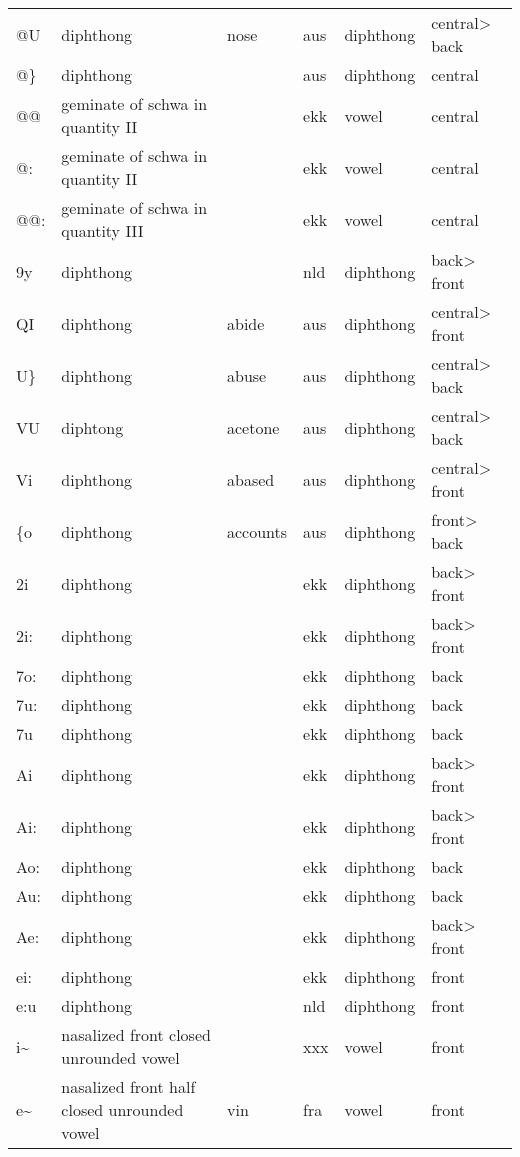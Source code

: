 {\begin{longtable}{l|p{.3\linewidth}|p{.15\linewidth}|l|p{.15\linewidth}|l}
	@U	& diphthong	& nose	& aus	& diphthong	& central\textgreater{} back	\\
	@\}	& diphthong	& 	& aus	& diphthong	& central	\\
	@@	& geminate of schwa in quantity II	& 	& ekk	& vowel	& central	\\
	@:	& geminate of schwa in quantity II	& 	& ekk	& vowel	& central	\\
	@@:	& geminate of schwa in quantity III	& 	& ekk	& vowel	& central	\\
	9y	& diphthong	& 	& nld	& diphthong	& back\textgreater{} front	\\
	QI	& diphthong	& abide	& aus	& diphthong	& central\textgreater{} front	\\
	U\}	& diphthong	& abuse	& aus	& diphthong	& central\textgreater{} back	\\
	VU	& diphtong	& acetone	& aus	& diphthong	& central\textgreater{} back	\\
	Vi	& diphthong	& abased	& aus	& diphthong	& central\textgreater{} front	\\
	\{o	& diphthong	& accounts	& aus	& diphthong	& front\textgreater{} back	\\
	2i	& diphthong	& 	& ekk	& diphthong	& back\textgreater{} front	\\
	2i:	& diphthong	& 	& ekk	& diphthong	& back\textgreater{} front	\\
	7o:	& diphthong	& 	& ekk	& diphthong	& back	\\
	7u:	& diphthong	& 	& ekk	& diphthong	& back	\\
	7u	& diphthong	& 	& ekk	& diphthong	& back	\\
	Ai	& diphthong	& 	& ekk	& diphthong	& back\textgreater{} front	\\
	Ai:	& diphthong	& 	& ekk	& diphthong	& back\textgreater{} front	\\
	Ao:	& diphthong	& 	& ekk	& diphthong	& back	\\
	Au:	& diphthong	& 	& ekk	& diphthong	& back	\\
	Ae:	& diphthong	& 	& ekk	& diphthong	& back\textgreater{} front	\\
	ei:	& diphthong	& 	& ekk	& diphthong	& front	\\
	e:u	& diphthong	& 	& nld	& diphthong	& front	\\
	i\textasciitilde{}	& nasalized front closed unrounded vowel	& 	& xxx	& vowel	& front	\\
	e\textasciitilde{}	& nasalized front half closed unrounded vowel	& vin	& fra	& vowel	& front	\\

\end{longtable}}
